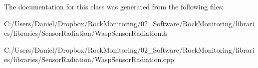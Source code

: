 The documentation for this class was generated from the following files\+:\begin{DoxyCompactItemize}
\item 
C\+:/\+Users/\+Daniel/\+Dropbox/\+Rock\+Monitoring/02\+\_\+\+Software/\+Rock\+Monitoring/libraries/libraries/\+Sensor\+Radiation/Wasp\+Sensor\+Radiation.\+h\item 
C\+:/\+Users/\+Daniel/\+Dropbox/\+Rock\+Monitoring/02\+\_\+\+Software/\+Rock\+Monitoring/libraries/libraries/\+Sensor\+Radiation/Wasp\+Sensor\+Radiation.\+cpp\end{DoxyCompactItemize}
